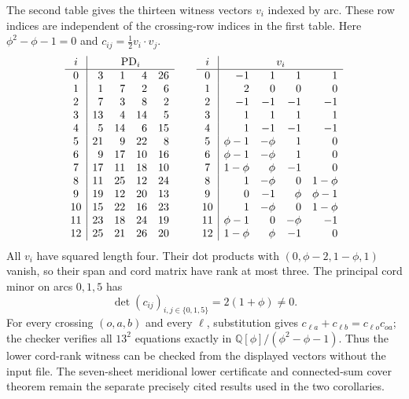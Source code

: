 \documentclass[11pt]{article}
\begin{document}
The second table gives the thirteen witness vectors $v_i$ indexed by
arc. These row indices are independent of the crossing-row indices in
the first table. Here $\phi^2-\phi-1=0$ and
$c_{ij}=\tfrac12v_i\cdot v_j$.
\[
\begin{array}{c|rrrr}
 i&\multicolumn{4}{c}{\mathrm{PD}_i}\\\hline
0 & 3 & 1 & 4 & 26\\
1 & 1 & 7 & 2 & 6\\
2 & 7 & 3 & 8 & 2\\
3 & 13 & 4 & 14 & 5\\
4 & 5 & 14 & 6 & 15\\
5 & 21 & 9 & 22 & 8\\
6 & 9 & 17 & 10 & 16\\
7 & 17 & 11 & 18 & 10\\
8 & 11 & 25 & 12 & 24\\
9 & 19 & 12 & 20 & 13\\
10 & 15 & 22 & 16 & 23\\
11 & 23 & 18 & 24 & 19\\
12 & 25 & 21 & 26 & 20\\
\end{array}
\qquad
\begin{array}{c|rrrr}
 i&\multicolumn{4}{c}{v_i}\\\hline
0 & -1 & 1 & 1 & 1\\
1 & 2 & 0 & 0 & 0\\
2 & -1 & -1 & -1 & -1\\
3 & 1 & 1 & 1 & 1\\
4 & 1 & -1 & -1 & -1\\
5 & \phi-1 & -\phi & 1 & 0\\
6 & \phi-1 & -\phi & 1 & 0\\
7 & 1-\phi & \phi & -1 & 0\\
8 & 1 & -\phi & 0 & 1-\phi\\
9 & 0 & -1 & \phi & \phi-1\\
10 & 1 & -\phi & 0 & 1-\phi\\
11 & \phi-1 & 0 & -\phi & -1\\
12 & 1-\phi & \phi & -1 & 0\\
\end{array}
\]
All $v_i$ have squared length four. Their dot products with
$(0,\phi-2,1-\phi,1)$ vanish, so their span and cord matrix have
rank at most three. The principal cord minor on arcs $0,1,5$ has
\[
                \det(c_{ij})_{i,j\in\{0,1,5\}}=2(1+\phi)\ne0.
\]
For every crossing $(o,a,b)$ and every $\ell$, substitution gives
$c_{\ell a}+c_{\ell b}=c_{\ell o}c_{oa}$; the checker verifies all
$13^2$ equations exactly in $\mathbb Q[\phi]/(\phi^2-\phi-1)$.
Thus the lower cord-rank witness can be checked from the displayed
vectors without the input file. The seven-sheet meridional lower
certificate and connected-sum cover theorem remain the separate
precisely cited results used in the two corollaries.
\end{document}
